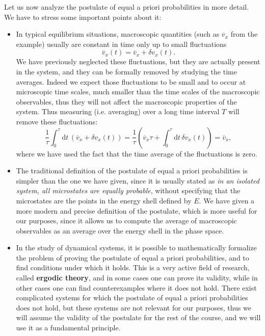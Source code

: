 Let us now analyze the postulate of equal a priori probabilities in more detail. We have to stress some important points about it:
\begin{itemize}
    \item In typical equilibrium situations, macroscopic quantities (such as \(\overline{v}_x\) from the example) usually are constant in time only up to small fluctuations
          \[
              \overline{v}_x(t) = \overline{v}_x + \delta v_x(t).
          \]
          We have previously neglected these fluctuations, but they are actually present in the system, and they can be formally removed by studying the time averages. Indeed we expect those fluctuations to be small and to occur at microscopic time scales, much smaller than the time scales of the macroscopic observables, thus they will not affect the macroscopic properties of the system. Thus measuring (i.e. averaging) over a long time interval \(T\) will remove these fluctuations:
          \[
              \frac{1}{\tau} \int_0^\tau \mathrm{d}t \, (\overline{v}_x + \delta v_x(t) ) = \frac{1}{\tau} \left( \overline{v}_x \tau + \int_0^\tau \mathrm{d}t \, \delta v_x(t) \right) = \overline{v}_x,
          \]
          where we have used the fact that the time average of the fluctuations is zero.
    \item The traditional definition of the postulate of equal a priori probabilities is simpler than the one we have given, since it is usually stated as \textit{in an isolated system, all microstates are equally probable}, without specifying that the microstates are the points in the energy shell defined by \(E\). We have given a more modern and precise definition of the postulate, which is more useful for our purposes, since it allows us to compute the average of macroscopic observables as an average over the energy shell in the phase space.
    \item In the study of dynamical systems, it is possible to mathematically formalize the problem of proving the postulate of equal a priori probabilities, and to find conditions under which it holds. This is a very active field of research, called \textbf{ergodic theory}, and in some cases one can prove its validity, while in other cases one can find counterexamples where it does not hold. There exist complicated systems for which the postulate of equal a priori probabilities does not hold, but these systems are not relevant for our purposes, thus we will assume the validity of the postulate for the rest of the course, and we will use it as a fundamental principle.

\end{itemize}
